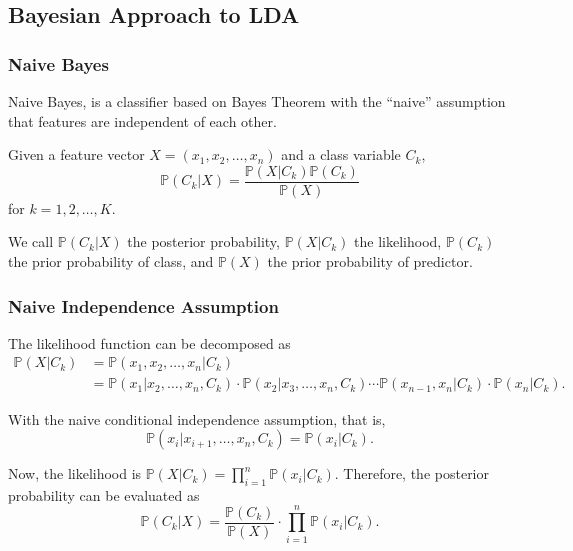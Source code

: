\documentclass[aspectratio = 169]{beamer}
\begin{document}
\subsection{Bayesian Approach to LDA}

\begin{frame}

\frametitle{Naive Bayes}

Naive Bayes, is a classifier based on Bayes Theorem with the ``naive'' assumption that features are independent of each other.


\vspace{0.4 cm}

\begin{theorem}

Given a feature vector $X = (x_1, x_2, \ldots, x_n)$ and a class variable $C_k$, 
$$
\mathbb{P}(C_k \vert X) = \frac{\mathbb{P}(X \vert C_k) \mathbb{P}(C_k)}{\mathbb{P}(X)}
$$
for $k = 1, 2, \ldots, K$.

We call $\mathbb{P}(C_k \vert X)$ the posterior probability, $\mathbb{P}(X \vert C_k)$ the likelihood, $\mathbb{P}(C_k)$ the prior probability of class, and $\mathbb{P}(X)$ the prior probability of predictor.

\end{theorem}

\end{frame}

\begin{frame}

\frametitle{Naive Independence Assumption}

The likelihood function can be decomposed as 
$$
\begin{aligned}
	\mathbb{P}(X \vert C_k) & = \mathbb{P}(x_1, x_2, \ldots, x_n \vert C_k) \\ 
	& = \mathbb{P}(x_1 \vert x_2, \ldots, x_n, C_k) \cdot \mathbb{P}(x_2 \vert x_3, \ldots, x_n, C_k) \cdots \mathbb{P}(x_{n - 1}, x_n \vert C_k) \cdot \mathbb{P}(x_n \vert C_k).
\end{aligned}
$$


With the naive conditional independence assumption, that is, 
$$
\mathbb{P}(x_i \vert x_{i + 1}, \ldots, x_n, C_k) = \mathbb{P}(x_i \vert C_k). 
$$


Now, the likelihood is $\mathbb{P}(X \vert C_k) = \displaystyle \prod_{i = 1}^n \mathbb{P}(x_i \vert C_k)$. Therefore, the posterior probability can be evaluated as 
$$
\mathbb{P}(C_k \vert X) = \frac{\mathbb{P}(C_k)}{\mathbb{P}(X)} \cdot \prod_{i = 1}^n \mathbb{P}(x_i \vert C_k).
$$


\end{frame}
\end{document}
